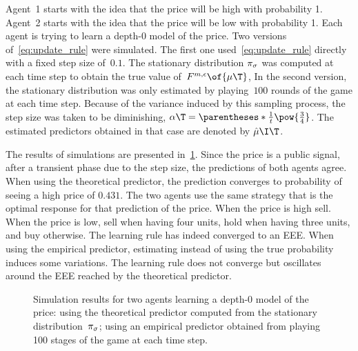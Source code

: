 Agent~1 starts with the idea that the price will be high with probability 1.
Agent~2 starts with the idea that the price will be low with probability 1.
Each agent is trying to learn a depth-\(0\) model of the price.
Two versions of~\cref{eq:update_rule} were simulated.
The first one used~\cref{eq:update_rule} directly with a fixed step size of~\(0.1\).
The stationary distribution \(\pi_{\sigma}\) was computed at each time step to obtain the true value of~\(\FF \of{\mu\T}\),
In the second version, the stationary distribution was only estimated by playing~\(100\) rounds of the game at each time step.
Because of the variance induced by this sampling process, the step size was taken to be diminishing, \(\alpha\T = \parentheses*{\frac{1}{t}}\pow{\frac{3}{4}}\).
The estimated predictors obtained in that case are denoted by \(\hat{\mu}\I\T\).

The results of simulations are presented in~\cref{fig:simulation}.
Since the price is a public signal, after a transient phase due to the step size, the predictions of both agents agree.
When using the theoretical predictor, the prediction converges to probability of seeing a high price of \(0.431\).
The two agents use the same strategy that is the optimal response for that prediction of the price.
When the price is high sell.
When the price is low, sell when having four units, hold when having three units, and buy otherwise.
The learning rule has indeed converged to an EEE.
When using the empirical predictor, estimating instead of using the true probability induces some variations.
The learning rule does not converge but oscillates around the EEE reached by the theoretical predictor.

\begin{figure}
\centering
{}
\caption{Simulation results for two agents learning a depth-\(0\) model of the price:
 using the theoretical predictor computed from the stationary distribution~\(\pi_{\sigma}\);
 using an empirical predictor obtained from playing 100 stages of the game at each time step.}
\label{fig:simulation}
\end{figure}


